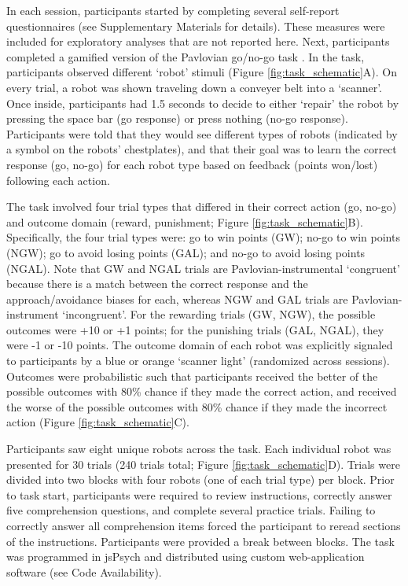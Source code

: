 \documentclass[a4paper,12pt]{article}
\begin{document}
\begin{refsection}[main]
In each session, participants started by completing several self-report questionnaires (see Supplementary Materials for details). These measures were included for exploratory analyses that are not reported here. Next, participants completed a gamified version of the Pavlovian go/no-go task \cite{guitart2012go, swart2017catecholaminergic}. In the task, participants observed different `robot' stimuli (Figure \ref{fig:task_schematic}A). On every trial, a robot was shown traveling down a conveyer belt into a `scanner'. Once inside, participants had 1.5 seconds to decide to either `repair' the robot by pressing the space bar (go response) or press nothing (no-go response). Participants were told that they would see different types of robots (indicated by a symbol on the robots' chestplates), and that their goal was to learn the correct response (go, no-go) for each robot type based on feedback (points won/lost) following each action.

The task involved four trial types that differed in their correct action (go, no-go) and outcome domain (reward, punishment; Figure \ref{fig:task_schematic}B). Specifically, the four trial types were: go to win points (GW); no-go to win points (NGW); go to avoid losing points (GAL); and no-go to avoid losing points (NGAL). Note that GW and NGAL trials are Pavlovian-instrumental `congruent' because there is a match between the correct response and the approach/avoidance biases for each, whereas NGW and GAL trials are Pavlovian-instrument `incongruent'. For the rewarding trials (GW, NGW), the possible outcomes were +10 or +1 points; for the punishing trials (GAL, NGAL), they were -1 or -10 points. The outcome domain of each robot was explicitly signaled to participants by a blue or orange `scanner light' (randomized across sessions). Outcomes were probabilistic such that participants received the better of the possible outcomes with 80\% chance if they made the correct action, and received the worse of the possible outcomes with 80\% chance if they made the incorrect action (Figure \ref{fig:task_schematic}C).

Participants saw eight unique robots across the task. Each individual robot was presented for 30 trials (240 trials total; Figure \ref{fig:task_schematic}D). Trials were divided into two blocks with four robots (one of each trial type) per block. Prior to task start, participants were required to review instructions, correctly answer five comprehension questions, and complete several practice trials. Failing to correctly answer all comprehension items forced the participant to reread sections of the instructions. Participants were provided a break between blocks. The task was programmed in jsPsych \cite{de2015jspsych} and distributed using custom web-application software (see Code Availability). 


\end{refsection}
\end{document}

